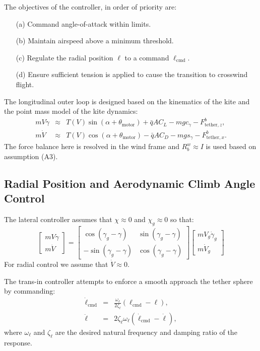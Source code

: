 \documentclass{article}
\newcommand{\thetam}{\theta_{\textrm{motor}}}
\newcommand{\radius}{\ell}
\newcommand{\dradius}{\dot \radius}
\newcommand{\radiuscmd}{\radius_\textrm{cmd}}
\newcommand{\dradiuscmd}{\dot \radius_\textrm{cmd}}
\newcommand{\ddradius}{\ddot \radius}
\newcommand{\omegaradius}{\omega_\radius}
\newcommand{\zetaradius}{\zeta_\radius}
\newcommand{\Ftetherx}{F^b_{\textrm{tether},x}}
\newcommand{\Ftetherz}{F^b_{\textrm{tether},z}}
\newcommand{\sgamma}{s_\gamma}
\begin{document}
The objectives of the controller, in order of priority are:
\begin{enumerate}
\item[(a)] Command angle-of-attack within limits.
\item[(b)] Maintain airspeed above a minimum threshold.
\item[(c)] Regulate the radial position $\radius$ to a command $\radiuscmd$.
\item[(d)] Ensure sufficient tension is applied to cause the
  transition to crosswind flight.
\end{enumerate}

The longitudinal outer loop is designed based on the kinematics of the
kite and the point mass model of the kite dynamics:
\begin{eqnarray}
m V \dot \gamma &\approx& T(V) \sin(\alpha + \thetam) + \bar q A C_L - mgc_\gamma - \Ftetherz,\\
m \dot V &\approx& T(V) \cos(\alpha + \thetam) - \bar q A C_D - mg \sgamma - \Ftetherx.
\end{eqnarray}
The force balance here is resolved in the wind frame and $R_b^w
\approx I$ is used based on assumption (A3).



\subsection{Radial Position and Aerodynamic Climb Angle Control}
The lateral controller assumes that $\chi \approx 0$ and $\chi_g
\approx 0$ so that:
\begin{equation}
\begin{bmatrix}
m V \dot \gamma\\
m\dot V
\end{bmatrix}
=
\begin{bmatrix}
\cos(\gamma_g - \gamma) & \sin(\gamma_g - \gamma) \\
-\sin(\gamma_g - \gamma) & \cos(\gamma_g - \gamma)
\end{bmatrix}
\begin{bmatrix}
m V_g \dot \gamma_g\\
m\dot V_g
\end{bmatrix}
\end{equation}
For radial control we assume that $\dot V \approx 0$.

The trans-in controller attempts to enforce a smooth approach the
tether sphere by commanding:
\begin{eqnarray}
\dradiuscmd &=& \frac{\omegaradius}{2\zetaradius}(\radiuscmd - \radius),\\
\ddradius &=& 2 \zetaradius \omegaradius (\dradiuscmd - \dradius),
\end{eqnarray}
where $\omegaradius$ and $\zetaradius$ are the desired natural frequency and
damping ratio of the response.
\end{document}
